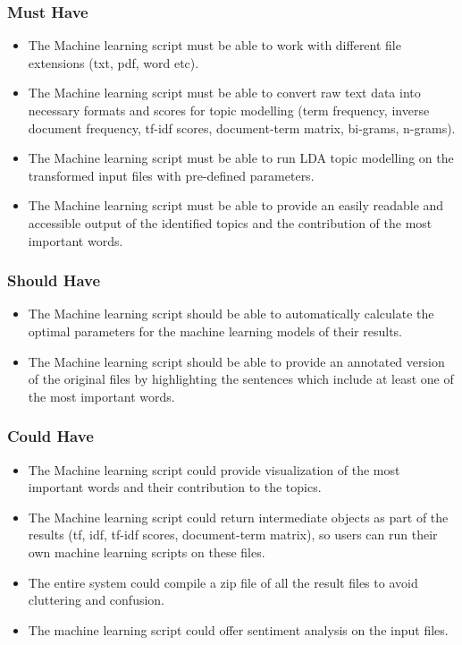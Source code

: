 \documentclass{l4proj}
\begin{document}
\subsubsection{Must Have}
\begin{itemize}
\item
The Machine learning script must be able to work with different file extensions (txt, pdf, word etc).
\item
The Machine learning script must be able to convert raw text data into necessary formats and scores for topic modelling (term frequency, inverse document frequency, tf-idf scores, document-term matrix, bi-grams, n-grams).
\item
The Machine learning script must be able to run LDA topic modelling on the transformed input files with pre-defined parameters.
\item
The Machine learning script must be able to provide an easily readable and accessible output of the identified topics and the contribution of the most important words.
\end{itemize}

\subsubsection{Should Have}
\begin{itemize}
\item
The Machine learning script should be able to automatically calculate the optimal parameters for the machine learning models of their results.
\item
The Machine learning script should be able to provide an annotated version of the original files by highlighting the sentences which include at least one of the most important words.

\end{itemize}

\subsubsection{Could Have}
\begin{itemize}
\item
The Machine learning script could provide visualization of the most important words and their contribution to the topics.
\item
The Machine learning script could return intermediate objects as part of the results (tf, idf, tf-idf scores, document-term matrix), so users can run their own machine learning scripts on these files. 
\item
The entire system could compile a zip file of all the result files to avoid cluttering and confusion.
\item
The machine learning script could offer sentiment analysis on the input files.

\end{itemize}
\end{document}
